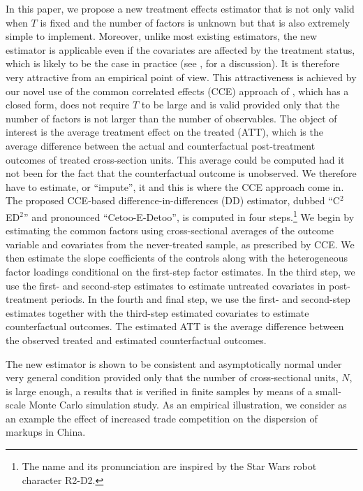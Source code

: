\documentclass[12pt,fleqn]{article}
\begin{document}
In this paper, we propose a new treatment effects estimator that is not only valid when $T$ is fixed and the number of factors is unknown but that is also extremely simple to implement. Moreover, unlike most existing estimators, the new estimator is applicable even if the covariates are affected by the treatment status, which is likely to be the case in practice (see \citealp{Caetano_Callaway_Payne_Rodrigues_2022}, for a discussion). It is therefore very attractive from an empirical point of view. This attractiveness is achieved by our novel use of the common correlated effects (CCE) approach of \citet{pesaran2006estimation}, which has a closed form, does not require $T$ to be large and is valid provided only that the number of factors is not larger than the number of observables. The object of interest is the average treatment effect on the treated (ATT), which is the average difference between the actual and counterfactual post-treatment outcomes of treated cross-section units. This average could be computed had it not been for the fact that the counterfactual outcome is unobserved. We therefore have to estimate, or ``impute'', it and this is where the CCE approach come in. The proposed CCE-based difference-in-differences (DD) estimator, dubbed ``C$^2$ED$^2$'' and pronounced ``Cetoo-E-Detoo'', is computed in four steps.\footnote{The name and its pronunciation are inspired by the Star Wars robot character R2-D2.} We begin by estimating the common factors using cross-sectional averages of the outcome variable and covariates from the never-treated sample, as prescribed by CCE. We then estimate the slope coefficients of the controls along with the heterogeneous factor loadings conditional on the first-step factor estimates. In the third step, we use the first- and second-step estimates to estimate untreated covariates in post-treatment periods. In the fourth and final step, we use the first- and second-step estimates together with the third-step estimated covariates to estimate counterfactual outcomes. The estimated ATT is the average difference between the observed treated and estimated counterfactual outcomes.

The new estimator is shown to be consistent and asymptotically normal under very general condition provided only that the number of cross-sectional units, $N$, is large enough, a results that is verified in finite samples by means of a small-scale Monte Carlo simulation study. As an empirical illustration, we consider as an example the effect of increased trade competition on the dispersion of markups in China.
\end{document}
